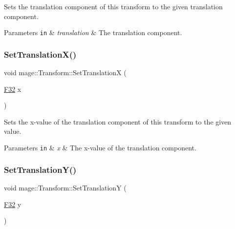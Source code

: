 Sets the translation component of this transform to the given translation component.


\begin{DoxyParams}[1]{Parameters}
\mbox{\tt in}  & {\em translation} & The translation component. \\
\hline
\end{DoxyParams}
\mbox{\label{classmage_1_1_transform_a99a7e4aaba6cee799bb014d9a1b5e227}} 
\subsubsection{\texorpdfstring{Set\+Translation\+X()}{SetTranslationX()}}
{\footnotesize\ttfamily void mage\+::\+Transform\+::\+Set\+TranslationX (\begin{DoxyParamCaption}\item[{\mbox{\hyperlink{namespacemage_aa97e833b45f06d60a0a9c4fc22ae02c0}{F32}}}]{x }\end{DoxyParamCaption})\hspace{0.3cm}{\ttfamily [noexcept]}}

Sets the x-\/value of the translation component of this transform to the given value.


\begin{DoxyParams}[1]{Parameters}
\mbox{\tt in}  & {\em x} & The x-\/value of the translation component. \\
\hline
\end{DoxyParams}
\mbox{\label{classmage_1_1_transform_ae33a9ea844cac0bdb303e4e347e576c3}} 
\subsubsection{\texorpdfstring{Set\+Translation\+Y()}{SetTranslationY()}}
{\footnotesize\ttfamily void mage\+::\+Transform\+::\+Set\+TranslationY (\begin{DoxyParamCaption}\item[{\mbox{\hyperlink{namespacemage_aa97e833b45f06d60a0a9c4fc22ae02c0}{F32}}}]{y }\end{DoxyParamCaption})\hspace{0.3cm}{\ttfamily [noexcept]}}

